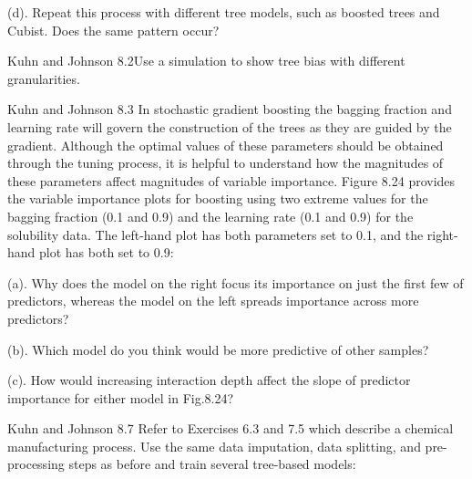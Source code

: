 \documentclass[]{report}
\begin{document}
\begin{subquestion}{(d).} Repeat this process with different tree models, such as boosted trees and Cubist. Does the same pattern occur?\end{subquestion}


\begin{question}{Kuhn and Johnson 8.2}Use a simulation to show tree bias with different granularities.\end{question}


\begin{question}{Kuhn and Johnson 8.3} In stochastic gradient boosting the bagging fraction and learning rate will govern the construction of the trees as they are guided by the gradient. Although the optimal values of these parameters should be obtained through the tuning process, it is helpful to understand how the magnitudes of these parameters affect magnitudes of variable importance. Figure 8.24 provides the variable importance plots for boosting using two extreme values for the bagging fraction (0.1 and 0.9) and the learning rate (0.1 and 0.9) for the solubility data. The left-hand plot has both parameters set to 0.1, and the right-hand plot has both set to 0.9: \end{question}

\begin{subquestion}{(a).} Why does the model on the right focus its importance on just the first few of predictors, whereas the model on the left spreads importance across more predictors? \end{subquestion}

\begin{subquestion}{(b).} Which model do you think would be more predictive of other samples?\end{subquestion}

\begin{subquestion}{(c).} How would increasing interaction depth affect the slope of predictor importance for either model in Fig.8.24?\end{subquestion}


\begin{question}{Kuhn and Johnson 8.7}
Refer to Exercises 6.3 and 7.5 which describe a chemical manufacturing process. Use the same data imputation, data splitting, and pre-processing steps as before and train several tree-based models:
\end{question}
\end{document}
